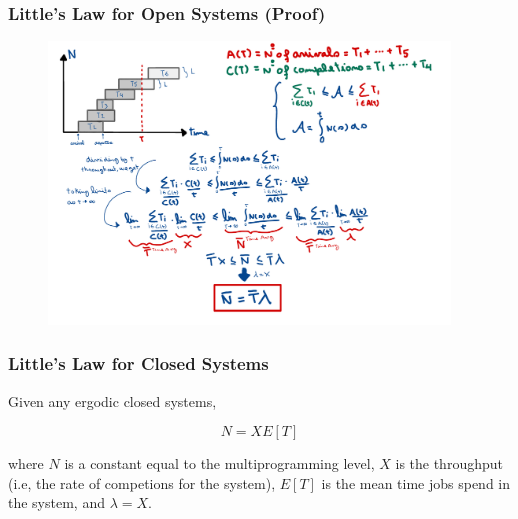\begin{frame}
    \frametitle{Little's Law for Open Systems (Proof)}

    
    \begin{figure}
        \centering
        \includegraphics[width=0.95\textwidth]{slides/figures/little_law_open_proof.pdf}
    \end{figure}

\end{frame}



\begin{frame}
    \frametitle{Little's Law for Closed Systems}

    \begin{definition}
        Given any ergodic closed systems,

        $$N = X E[T]$$

        where $N$ is a constant equal to the multiprogramming level, $X$
        is the throughput (i.e, the rate of competions for the system),
        $E[T]$ is the mean time jobs spend in the system, and $\lambda=X$.

    \end{definition}

\end{frame}

